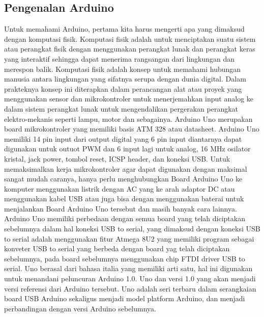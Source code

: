 \subsection{Pengenalan Arduino}
 	Untuk memahami Arduino, pertama kita harus mengerti apa yang dimaksud dengan komputasi fisik. Komputasi fisik adalah untuk menciptakan suatu sistem atau perangkat fisik dengan menggunakan perangkat lunak dan perangkat keras yang interaktif sehingga dapat menerima rangsangan dari lingkungan dan merespon balik. Komputasi fisik adalah konsep untuk memahami hubungan manusia antara lingkungan yang sifatnya serupa dengan dunia digital. Dalam prakteknya konsep ini diterapkan dalam perancangan alat atau proyek yang menggunakan sensor dan mikrokontroler untuk menerjemahkan input analog ke dalam sistem perangkat lunak untuk mengendalikan pergerakan perangkat elektro-mekanis seperti lampu, motor dan sebagainya.
 	Arduino Uno merupakan board mikrokontroler yang memiliki basis ATM 328 atau datasheet. Arduino Uno memiliki 14 pin input dari output digital yang 6 pin input diantarnya dapat digunakan untuk outuot PWM dan 6 input lagi untuk analog, 16 MHz osilator kristal, jack power, tombol reset, ICSP header, dan koneksi USB. Untuk memaksimalkan kerja mikrokontroler agar dapat digunakan dengan maksimal sangat mudah caranya, hanya perlu menghubungkan Board Arduino Uno ke komputer menggunakan listrik dengan  AC yang ke arah  adaptor DC atau menggunakan kabel USB atau  juga bisa dengan menggunakan baterai untuk menjalankan Board Arduino Uno tersebut dan masih banyak cara lainnya.
  	Arduino Uno memiliki perbedaan dengan semua board yang telah diciptakan sebelumnya dalam hal koneksi USB to serial, yang dimaksud dengan koneksi USB to serial adalah menggunakan fitur Atmega 8U2 yang memiliki program sebagai konveter USB to serial yang berbeda dengan board yag telah diciptakan sebelumnya, pada board sebelumnya menggunakan chip FTDI driver USB to serial.
  	Uno berasal dari bahasa italia yang memiliki arti satu, hal ini digunakan untuk menandani peluncuran Arduino 1.0. Uno dan versi 1.0 yang akan menjadi versi referensi dari Arduino tersebut. Uno adalah seri terbaru dalam serangkaian board USB Arduino sekaligus menjadi model platform Arduino, dan menjadi perbandingan dengan versi Arduino sebelumnya.\cite{doukas2012building}

